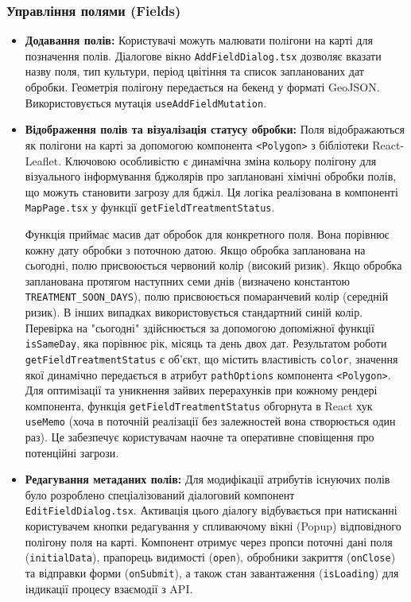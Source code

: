 \subsubsection{Управління полями (Fields)}
\begin{itemize}
    \item \textbf{Додавання полів:} Користувачі можуть малювати полігони на карті для позначення полів. Діалогове вікно \texttt{AddFieldDialog.tsx} дозволяє вказати назву поля, тип культури, період цвітіння та список запланованих дат обробки. Геометрія полігону передається на бекенд у форматі GeoJSON. Використовується мутація \texttt{useAddFieldMutation}.
    
    \item \textbf{Відображення полів та візуалізація статусу обробки:} 
    Поля відображаються як полігони на карті за допомогою компонента \texttt{<Polygon>} з бібліотеки React-Leaflet. Ключовою особливістю є динамічна зміна кольору полігону для візуального інформування бджолярів про заплановані хімічні обробки полів, що можуть становити загрозу для бджіл. Ця логіка реалізована в компоненті \texttt{MapPage.tsx} у функції \texttt{getFieldTreatmentStatus}. 
    
    Функція приймає масив дат обробок для конкретного поля. Вона порівнює кожну дату обробки з поточною датою. Якщо обробка запланована на сьогодні, полю присвоюється червоний колір (високий ризик). Якщо обробка запланована протягом наступних семи днів (визначено константою \texttt{TREATMENT\_SOON\_DAYS}), полю присвоюється помаранчевий колір (середній ризик). В інших випадках використовується стандартний синій колір. Перевірка на "сьогодні" здійснюється за допомогою допоміжної функції \texttt{isSameDay}, яка порівнює рік, місяць та день двох дат. Результатом роботи \texttt{getFieldTreatmentStatus} є об'єкт, що містить властивість \texttt{color}, значення якої динамічно передається в атрибут \texttt{pathOptions} компонента \texttt{<Polygon>}. Для оптимізації та уникнення зайвих перерахунків при кожному рендері компонента, функція \texttt{getFieldTreatmentStatus} обгорнута в React хук \texttt{useMemo} (хоча в поточній реалізації без залежностей вона створюється один раз). Це забезпечує користувачам наочне та оперативне сповіщення про потенційні загрози.

    \item \textbf{Редагування метаданих полів:} 
    Для модифікації атрибутів існуючих полів було розроблено спеціалізований діалоговий компонент \texttt{EditFieldDialog.tsx}. Активація цього діалогу відбувається при натисканні користувачем кнопки редагування у спливаючому вікні (Popup) відповідного полігону поля на карті. Компонент отримує через пропси поточні дані поля (\texttt{initialData}), прапорець видимості (\texttt{open}), обробники закриття (\texttt{onClose}) та відправки форми (\texttt{onSubmit}), а також стан завантаження (\texttt{isLoading}) для індикації процесу взаємодії з API.
    

\end{itemize}
